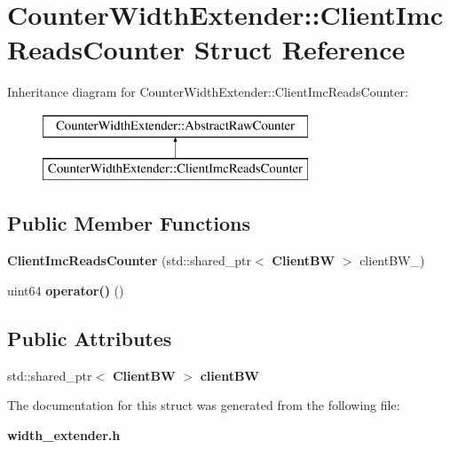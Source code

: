 \section{Counter\+Width\+Extender\+:\+:Client\+Imc\+Reads\+Counter Struct Reference}
\label{structCounterWidthExtender_1_1ClientImcReadsCounter}
Inheritance diagram for Counter\+Width\+Extender\+:\+:Client\+Imc\+Reads\+Counter\+:\begin{figure}[H]
\begin{center}
\leavevmode
\includegraphics[height=2.000000cm]{structCounterWidthExtender_1_1ClientImcReadsCounter}
\end{center}
\end{figure}
\subsection*{Public Member Functions}
\begin{DoxyCompactItemize}
\item 
\mbox{\label{structCounterWidthExtender_1_1ClientImcReadsCounter_abf1eb49eba1237aa421c17515d4f2cbc}} 
{\bfseries Client\+Imc\+Reads\+Counter} (std\+::shared\+\_\+ptr$<$ \textbf{ Client\+BW} $>$ client\+B\+W\+\_\+)
\item 
\mbox{\label{structCounterWidthExtender_1_1ClientImcReadsCounter_a2ce041afc601d13a4c19d75c2fae548f}} 
uint64 {\bfseries operator()} ()
\end{DoxyCompactItemize}
\subsection*{Public Attributes}
\begin{DoxyCompactItemize}
\item 
\mbox{\label{structCounterWidthExtender_1_1ClientImcReadsCounter_a5bdef13d0d61c44507001729451d6222}} 
std\+::shared\+\_\+ptr$<$ \textbf{ Client\+BW} $>$ {\bfseries client\+BW}
\end{DoxyCompactItemize}


The documentation for this struct was generated from the following file\+:\begin{DoxyCompactItemize}
\item 
\textbf{ width\+\_\+extender.\+h}\end{DoxyCompactItemize}
